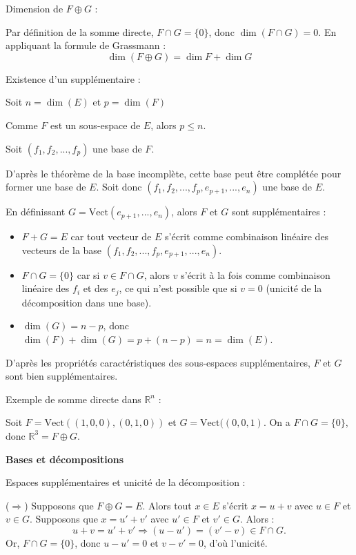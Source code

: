 \documentclass[10pt,a4paper]{article}
\begin{document}
\q Dimension de $F \oplus G$ :

Par définition de la somme directe, $F \cap G = \{0\}$, donc $\dim(F \cap G) = 0$. En appliquant la
formule de Grassmann :
\[\dim(F \oplus G) = \dim F + \dim G \]


\q Existence d'un supplémentaire :

Soit $n = \dim(E)$ et $p = \dim(F)$

Comme $F$ est un sous-espace de $E$, alors $p \leq n$.

Soit $(f_1, f_2, ..., f_p)$ une base de $F$.

D'après le théorème de la base incomplète, cette base peut être complétée pour former une base de
$E$. Soit donc $(f_1, f_2, ..., f_p, e_{p+1}, ..., e_n)$ une base de $E$.

En définissant $G = \text{Vect}(e_{p+1}, ..., e_n)$, alors $F$ et $G$ sont supplémentaires :
\begin{itemize}
    \item $F + G = E$ car tout vecteur de $E$ s'écrit comme combinaison linéaire des vecteurs de la
   base $(f_1, f_2, ..., f_p, e_{p+1}, ..., e_n)$.
    \item $F \cap G = \{0\}$ car si $v \in F \cap G$, alors $v$ s'écrit à la fois comme
   combinaison linéaire des $f_i$ et des $e_j$, ce qui n'est possible que si $v = 0$ (unicité de la
   décomposition dans une base).
    \item $\dim(G) = n - p$, donc $\dim(F) + \dim(G) = p + (n-p) = n = \dim(E)$.
\end{itemize}
D'après les propriétés caractéristiques des sous-espaces supplémentaires, $F$ et $G$ sont
bien supplémentaires.

\q Exemple de somme directe dans $\mathbb{R}^n$ :

Soit $F = \text{Vect}((1, 0, 0), (0, 1, 0))$ et $G = \text{Vect}((0, 0, 1)$. On a $F \cap G =
\{0\}$, donc $\mathbb{R}^3 = F \oplus G$.

\bigskip
\textbf{Bases et décompositions}

\q Espaces supplémentaires et unicité de la décomposition :

($\Rightarrow$) Supposons que $F \oplus G = E$. Alors tout $x \in E$ s'écrit $x = u + v$
avec $u \in F$ et $v \in G$. Supposons que $x = u' + v'$ avec $u' \in F$ et $v' \in G$. Alors :
\[u + v = u' + v' \Rightarrow (u - u') = (v' - v) \in F \cap G. \] Or, $F \cap G = \{0\}$, donc $u -
u' = 0$ et $v - v' = 0$, d'où l'unicité.
\end{document}
